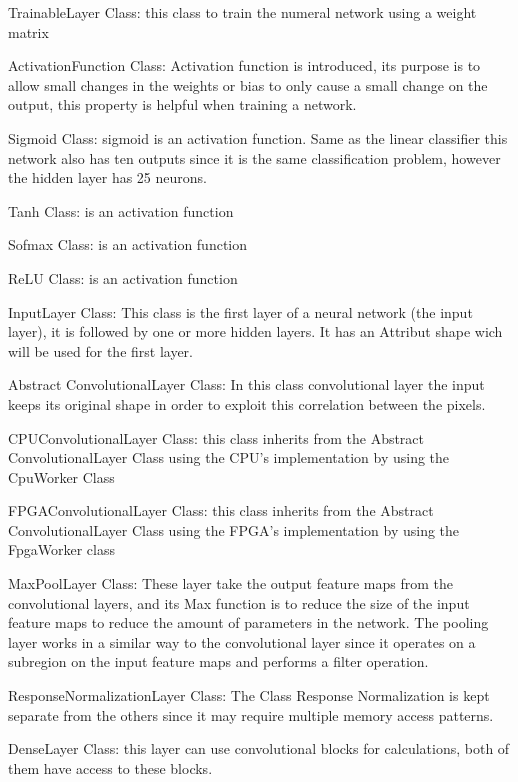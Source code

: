 \documentclass[parskip=full]{scrartcl}
\begin{document}
TrainableLayer Class: this class to train the numeral network using a weight matrix

ActivationFunction Class:  Activation function is introduced, its purpose is to allow small changes in the weights or bias to only cause a small change on the output, this property is helpful when training a network.

Sigmoid Class: sigmoid is an activation function.  Same as the linear classifier this network also has ten outputs since it is the same classification problem, however the hidden layer has 25 neurons.

Tanh Class: is an activation function

Sofmax Class: is an activation function

ReLU Class:  is an activation function










InputLayer Class: This class is the first layer of a neural network (the input layer), it is followed by one or more hidden layers.  It has an Attribut shape wich will be used for the first layer.

Abstract ConvolutionalLayer Class: In this class convolutional layer the input keeps its original shape in order to exploit this correlation between the pixels. 

CPUConvolutionalLayer Class: this class inherits from the Abstract ConvolutionalLayer Class using the CPU’s implementation by using the CpuWorker Class

FPGAConvolutionalLayer Class: this class inherits from the Abstract ConvolutionalLayer Class using the FPGA’s implementation by using the FpgaWorker class

MaxPoolLayer Class: These layer take the output feature maps from the convolutional layers, and its Max function is to reduce the size of the input feature maps to reduce the amount of parameters in the network.
The pooling layer works in a similar way to the convolutional layer since it operates on a subregion on the input feature maps and performs a filter operation.

ResponseNormalizationLayer Class: The Class Response Normalization is kept separate from the others since it may require multiple memory access patterns.

DenseLayer Class:  this layer can use convolutional blocks for calculations, both of them have access to these blocks.
\end{document}
